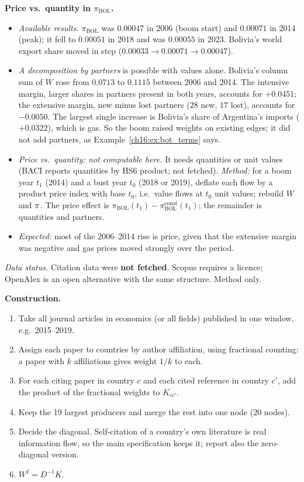 \documentclass[../solutions_manual.tex]{subfiles}
\begin{document}
 \textbf{Price vs.\ quantity in $\pi_{\text{BOL}}$.}
\begin{itemize}
\item \emph{Available results.} $\pi_{\text{BOL}}$ was $0.00047$ in 2006 (boom start) and $0.00071$ in 2014 (peak); it fell to $0.00051$ in 2018 and was $0.00055$ in 2023. Bolivia's world export share moved in step ($0.00033 \to 0.00071 \to 0.00047$).
\item \emph{A decomposition by partners} is possible with values alone. Bolivia's column sum of $W$ rose from $0.0713$ to $0.1115$ between 2006 and 2014. The intensive margin, larger shares in partners present in both years, accounts for $+0.0451$; the extensive margin, new minus lost partners ($28$ new, $17$ lost), accounts for $-0.0050$. The largest single increase is Bolivia's share of Argentina's imports ($+0.0322$), which is gas. So the boom raised weights on existing edges; it did not add partners, as Example~\ref{ch16:ex:bot_terms} says.
\item \emph{Price vs.\ quantity: not computable here.} It needs quantities or unit values (BACI reports quantities by HS6 product; not fetched). \emph{Method:} for a boom year $t_1$ (2014) and a bust year $t_0$ (2018 or 2019), deflate each flow by a product price index with base $t_0$, i.e.\ value flows at $t_0$ unit values; rebuild $W$ and $\pi$. The price effect is $\pi_{\text{BOL}}(t_1) - \pi_{\text{BOL}}^{\text{const}}(t_1)$; the remainder is quantities and partners.
\item \emph{Expected:} most of the 2006--2014 rise is price, given that the extensive margin was negative and gas prices moved strongly over the period.
\end{itemize}


\emph{Data status.} Citation data were \textbf{not fetched}. Scopus requires a licence; OpenAlex is an open alternative with the same structure. Method only.

 \textbf{Construction.}
\begin{enumerate}
\item Take all journal articles in economics (or all fields) published in one window, e.g.\ 2015--2019.
\item Assign each paper to countries by author affiliation, using fractional counting: a paper with $k$ affiliations gives weight $1/k$ to each.
\item For each citing paper in country $c$ and each cited reference in country $c'$, add the product of the fractional weights to $K_{cc'}$.
\item Keep the 19 largest producers and merge the rest into one node (20 nodes).
\item Decide the diagonal. Self-citation of a country's own literature is real information flow, so the main specification keeps it; report also the zero-diagonal version.
\item $W^I = D^{-1}K$.
\end{enumerate}
\end{document}
